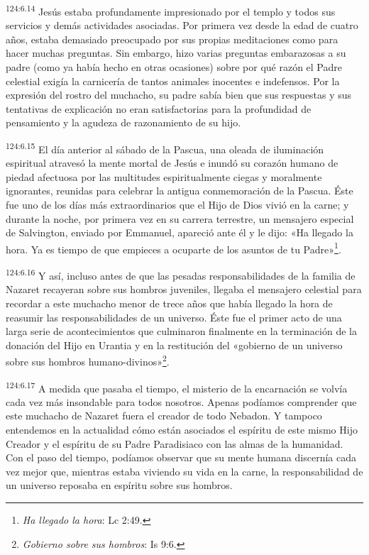 \par 
\textsuperscript{124:6.14} Jesús estaba profundamente impresionado por el templo y todos sus servicios y demás actividades asociadas. Por primera vez desde la edad de cuatro años, estaba demasiado preocupado por sus propias meditaciones como para hacer muchas preguntas. Sin embargo, hizo varias preguntas embarazosas a su padre (como ya había hecho en otras ocasiones) sobre por qué razón el Padre celestial exigía la carnicería de tantos animales inocentes e indefensos. Por la expresión del rostro del muchacho, su padre sabía bien que sus respuestas y sus tentativas de explicación no eran satisfactorias para la profundidad de pensamiento y la agudeza de razonamiento de su hijo.

\par 
\textsuperscript{124:6.15} El día anterior al sábado de la Pascua, una oleada de iluminación espiritual atravesó la mente mortal de Jesús e inundó su corazón humano de piedad afectuosa por las multitudes espiritualmente ciegas y moralmente ignorantes, reunidas para celebrar la antigua conmemoración de la Pascua. Éste fue uno de los días más extraordinarios que el Hijo de Dios vivió en la carne; y durante la noche, por primera vez en su carrera terrestre, un mensajero especial de Salvington, enviado por Emmanuel, apareció ante él y le dijo: «Ha llegado la hora. Ya es tiempo de que empieces a ocuparte de los asuntos de tu Padre»\footnote{\textit{Ha llegado la hora}: Lc 2:49.}.

\par 
\textsuperscript{124:6.16} Y así, incluso antes de que las pesadas responsabilidades de la familia de Nazaret recayeran sobre sus hombros juveniles, llegaba el mensajero celestial para recordar a este muchacho menor de trece años que había llegado la hora de reasumir las responsabilidades de un universo. Éste fue el primer acto de una larga serie de acontecimientos que culminaron finalmente en la terminación de la donación del Hijo en Urantia y en la restitución del «gobierno de un universo sobre sus hombros humano-divinos»\footnote{\textit{Gobierno sobre sus hombros}: Is 9:6.}.

\par 
\textsuperscript{124:6.17} A medida que pasaba el tiempo, el misterio de la encarnación se volvía cada vez más insondable para todos nosotros. Apenas podíamos comprender que este muchacho de Nazaret fuera el creador de todo Nebadon. Y tampoco entendemos en la actualidad cómo están asociados el espíritu de este mismo Hijo Creador y el espíritu de su Padre Paradisiaco con las almas de la humanidad. Con el paso del tiempo, podíamos observar que su mente humana discernía cada vez mejor que, mientras estaba viviendo su vida en la carne, la responsabilidad de un universo reposaba en espíritu sobre sus hombros.

